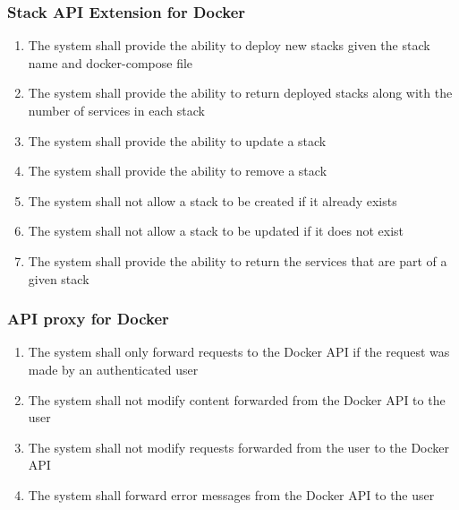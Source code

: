 \documentclass[]{article}
\newcommand{\docker}{Docker }
\begin{document}
\subsubsection{Stack API Extension for Docker}
\begin{enumerate}[label*=R3.\arabic*.]
	\item The system shall provide the ability to deploy new stacks given the stack name and docker-compose file
	\item The system shall provide the ability to return deployed stacks along with the number of services in each stack
	\item The system shall provide the ability to update a stack
	\item The system shall provide the ability to remove a stack
	\item The system shall not allow a stack to be created if it already exists
	\item The system shall not allow a stack to be updated if it does not exist
	\item The system shall provide the ability to return the services that are part of a given stack
\end{enumerate}

\subsubsection{API proxy for Docker}
\begin{enumerate}[label*=R4.\arabic*]
	\item The system shall only forward requests to the \docker API if the request was made by an authenticated user
	\item The system shall not modify content forwarded from the \docker API to the user
	\item The system shall not modify requests forwarded from the user to the \docker API
	\item The system shall forward error messages from the \docker API to the user
\end{enumerate}
\end{document}
